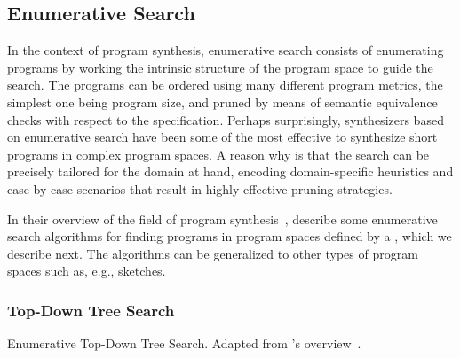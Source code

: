 \subsection{Enumerative Search}
\label{sec:enumerative-search}

In the context of program synthesis, enumerative search consists of enumerating
programs by working the intrinsic structure of the program space to guide the
search.
The programs can be ordered using many different program metrics, the simplest
one being program size, and pruned by means of semantic equivalence checks with
respect to the specification.
Perhaps surprisingly, synthesizers based on enumerative search have been some of
the most effective to synthesize short programs in complex program spaces.
A reason why is that the search can be precisely tailored for the domain at
hand, encoding domain-specific heuristics and case-by-case scenarios that
result in highly effective pruning strategies.

In their overview of the field of program synthesis~\cite{Gulwani2017},
\citeauthor{Gulwani2017} describe some enumerative search algorithms for finding
programs in program spaces defined by a , which we describe
next.
The algorithms can be generalized to other types of program spaces such as,
e.g., sketches.

\subsubsection{Top-Down Tree Search}
\label{sec:top-down-tree-search}

\begin{algorithm}
  \DontPrintSemicolon
  \LinesNotNumbered




  \caption{Enumerative Top-Down Tree Search.
    Adapted from \citeauthor{Gulwani2017}'s overview~\cite{Gulwani2017}.}
  \label{alg:enum-top-down}
\end{algorithm}


